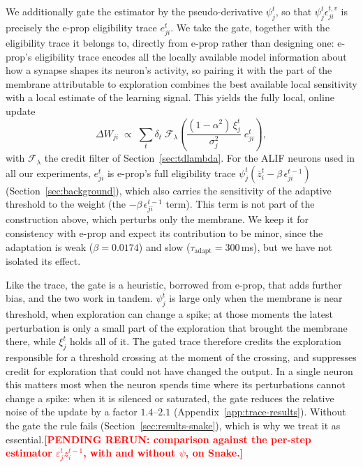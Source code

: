 \documentclass[10pt,twocolumn]{article}
\newcommand{\pending}[1]{\textcolor{red}{\bfseries[PENDING RERUN#1]}}
\begin{document}
We additionally gate the estimator by the pseudo-derivative $\psi^t_j$, so that
$\psi^t_j\epsilon^{t,v}_{ji}$ is precisely the e-prop eligibility trace
$e^t_{ji}$. We take the gate, together with the eligibility trace it belongs
to, directly from e-prop rather than designing one: e-prop's eligibility trace
encodes all the locally available model information about how a synapse
shapes its neuron's activity, so pairing it with the part of the membrane
attributable to exploration combines the best available local sensitivity with
a local estimate of the learning signal. This yields the fully local, online
update
\begin{equation}
\Delta W_{ji}\;\propto\;\sum_t \delta_t\;\mathcal{F}_{\lambda}\!\left(
\frac{(1-\alpha^2)\,\xi^t_j}{\sigma_j^2}\; e^t_{ji}\right),
\label{eq:distributed-update}
\end{equation}
with $\mathcal{F}_{\lambda}$ the credit filter of Section~\ref{sec:tdlambda}.
For the ALIF neurons used in all our experiments, $e^t_{ji}$ is e-prop's full
eligibility trace $\psi^t_j(\bar z^t_i-\beta\,\epsilon^{t-1}_{ji})$
(Section~\ref{sec:background}), which also carries the sensitivity of the
adaptive threshold to the weight (the $-\beta\,\epsilon^{t-1}_{ji}$ term). This
term is not part of the construction above, which perturbs only the membrane.
We keep it for consistency with e-prop and expect its contribution to be minor,
since the adaptation is weak ($\beta=0.0174$) and slow
($\tau_{\mathrm{adapt}}=300$\,ms), but we have not isolated its effect.

Like the trace, the gate is a heuristic, borrowed from e-prop, that adds
further bias, and the two work in tandem. $\psi^t_j$ is large only when the
membrane is near threshold, when exploration can change a spike; at those
moments the latest perturbation is only a small part of the exploration that
brought the membrane there, while $\xi^t_j$ holds all of it. The gated trace
therefore credits the exploration responsible for a threshold crossing at the
moment of the crossing, and suppresses credit for exploration that could not
have changed the output. In a single neuron this matters most when the neuron
spends time where its perturbations cannot change a spike: when it is silenced
or saturated, the gate reduces the relative noise of the update by a factor
$1.4$--$2.1$ (Appendix~\ref{app:trace-results}). Without the gate the rule fails
(Section~\ref{sec:results-snake}), which is why we treat it as
essential.\pending{: comparison against the per-step estimator
$\varepsilon^t_j z^{t-1}_i$, with and without $\psi$, on Snake.}
\end{document}
